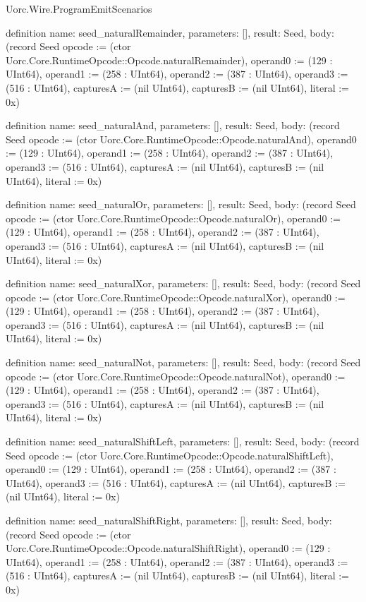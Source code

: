 \begin{lexlean}{Uorc.Wire.ProgramEmitScenarios}
\begin{semanticmodule}
definition{
  name: seed_naturalRemainder,
  parameters: [],
  result: Seed,
  body: (record Seed {opcode := (ctor Uorc.Core.RuntimeOpcode::Opcode.naturalRemainder), operand0 := (129 : UInt64), operand1 := (258 : UInt64), operand2 := (387 : UInt64), operand3 := (516 : UInt64), capturesA := (nil UInt64), capturesB := (nil UInt64), literal := 0x})
}

definition{
  name: seed_naturalAnd,
  parameters: [],
  result: Seed,
  body: (record Seed {opcode := (ctor Uorc.Core.RuntimeOpcode::Opcode.naturalAnd), operand0 := (129 : UInt64), operand1 := (258 : UInt64), operand2 := (387 : UInt64), operand3 := (516 : UInt64), capturesA := (nil UInt64), capturesB := (nil UInt64), literal := 0x})
}

definition{
  name: seed_naturalOr,
  parameters: [],
  result: Seed,
  body: (record Seed {opcode := (ctor Uorc.Core.RuntimeOpcode::Opcode.naturalOr), operand0 := (129 : UInt64), operand1 := (258 : UInt64), operand2 := (387 : UInt64), operand3 := (516 : UInt64), capturesA := (nil UInt64), capturesB := (nil UInt64), literal := 0x})
}

definition{
  name: seed_naturalXor,
  parameters: [],
  result: Seed,
  body: (record Seed {opcode := (ctor Uorc.Core.RuntimeOpcode::Opcode.naturalXor), operand0 := (129 : UInt64), operand1 := (258 : UInt64), operand2 := (387 : UInt64), operand3 := (516 : UInt64), capturesA := (nil UInt64), capturesB := (nil UInt64), literal := 0x})
}

definition{
  name: seed_naturalNot,
  parameters: [],
  result: Seed,
  body: (record Seed {opcode := (ctor Uorc.Core.RuntimeOpcode::Opcode.naturalNot), operand0 := (129 : UInt64), operand1 := (258 : UInt64), operand2 := (387 : UInt64), operand3 := (516 : UInt64), capturesA := (nil UInt64), capturesB := (nil UInt64), literal := 0x})
}

definition{
  name: seed_naturalShiftLeft,
  parameters: [],
  result: Seed,
  body: (record Seed {opcode := (ctor Uorc.Core.RuntimeOpcode::Opcode.naturalShiftLeft), operand0 := (129 : UInt64), operand1 := (258 : UInt64), operand2 := (387 : UInt64), operand3 := (516 : UInt64), capturesA := (nil UInt64), capturesB := (nil UInt64), literal := 0x})
}

definition{
  name: seed_naturalShiftRight,
  parameters: [],
  result: Seed,
  body: (record Seed {opcode := (ctor Uorc.Core.RuntimeOpcode::Opcode.naturalShiftRight), operand0 := (129 : UInt64), operand1 := (258 : UInt64), operand2 := (387 : UInt64), operand3 := (516 : UInt64), capturesA := (nil UInt64), capturesB := (nil UInt64), literal := 0x})
}


\end{semanticmodule}
\end{lexlean}

